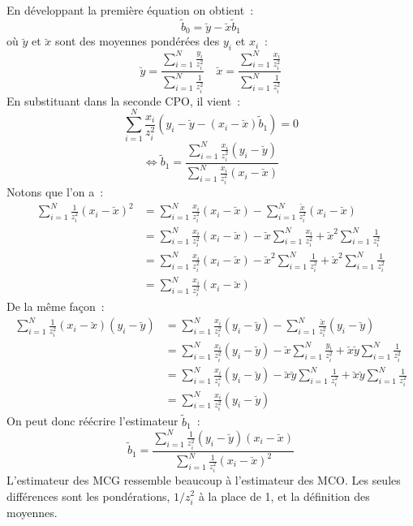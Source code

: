 \documentclass[12pt,a4paper,notitlepage]{article}
\begin{document}
En développant la première équation on obtient~:
\[
\tilde b_0 = \breve y - \breve x \tilde b_1
\]
où $\breve y$ et $\breve x$ sont des moyennes pondérées des $y_i$ et $x_i$~:
\[
\breve y = \frac{\sum_{i=1}^N\frac{y_i}{z_i^2}}{\sum_{i=1}^N\frac{1}{z_i^2}}\quad \breve x = \frac{\sum_{i=1}^N\frac{x_i}{z_i^2}}{\sum_{i=1}^N\frac{1}{z_i^2}}
\]
En substituant dans la seconde CPO, il vient~:
\[
 \sum_{i=1}^N\frac{x_i}{z_i^2}\left( y_i-\breve y - \left(x_i-\breve x \right)\tilde b_1 \right) = 0
\]
\[
\Leftrightarrow \tilde b_1 = \frac{\sum_{i=1}^N \frac{x_i}{z_i^2}(y_i-\breve y)}{\sum_{i=1}^N \frac{x_i}{z_i^2}(x_i-\breve x)}
\]
Notons que l'on a~:
\[
  \begin{split}
    \sum_{i=1}^N \frac{1}{z_i^2}\left(x_i-\breve x\right)^2 &= \sum_{i=1}^N \frac{x_i}{z_i^2}\left(x_i-\breve x\right) - \sum_{i=1}^N \frac{\breve x}{z_i^2}\left(x_i-\breve x\right)\\
                                                            &= \sum_{i=1}^N \frac{x_i}{z_i^2}\left(x_i-\breve x\right) - \breve x \sum_{i=1}^N\frac{x_i}{z_i^2} + \breve x^2\sum_{i=1}^N\frac{1}{z_i^2}\\
                                                            &= \sum_{i=1}^N \frac{x_i}{z_i^2}\left(x_i-\breve x\right) - \breve x^2 \sum_{i=1}^N\frac{1}{z_i^2} + \breve x^2\sum_{i=1}^N\frac{1}{z_i^2}\\
                                                            &= \sum_{i=1}^N \frac{x_i}{z_i^2}\left(x_i-\breve x\right)
  \end{split}
\]
De la même façon~:
\[
  \begin{split}
    \sum_{i=1}^N \frac{1}{z_i^2}\left(x_i-\breve x\right)\left(y_i-\breve y\right) &= \sum_{i=1}^N \frac{x_i}{z_i^2}\left(y_i-\breve y\right) - \sum_{i=1}^N \frac{\breve x}{z_i^2}\left(y_i-\breve y\right)\\
                                                            &= \sum_{i=1}^N \frac{x_i}{z_i^2}\left(y_i-\breve y\right) - \breve x \sum_{i=1}^N\frac{y_i}{z_i^2} + \breve x\breve y\sum_{i=1}^N\frac{1}{z_i^2}\\
                                                            &= \sum_{i=1}^N \frac{x_i}{z_i^2}\left(y_i-\breve y\right) - \breve x\breve y \sum_{i=1}^N\frac{1}{z_i^2} + \breve x\breve y\sum_{i=1}^N\frac{1}{z_i^2}\\
                                                            &= \sum_{i=1}^N \frac{x_i}{z_i^2}\left(y_i-\breve y\right)
  \end{split}
\]
On peut donc réécrire l'estimateur $\tilde b_1$~:
\[
\tilde b_1 = \frac{\sum_{i=1}^N \frac{1}{z_i^2}(y_i-\breve y)(x_i - \breve x)}{\sum_{i=1}^N \frac{1}{z_i^2}(x_i-\breve x)^2}
\]
L'estimateur des MCG ressemble beaucoup à l'estimateur des MCO. Les
seules différences sont les pondérations, $1/z_i^2$ à la place de 1,
et la définition des moyennes.\newline
\end{document}
